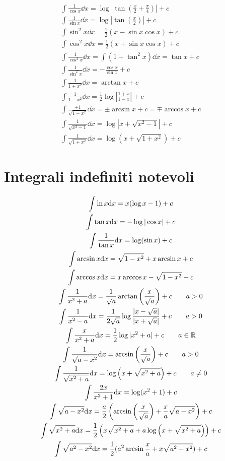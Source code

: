 \begin{gather}
\int\frac{1}{\cos x} \dd x = \log|\tan(\frac{x}{2}+\frac{\pi}{4})|+c \\
\int\frac{1}{\sin x} \dd x = \log|\tan(\frac{x}{2})|+c \\
\int\sin^2 x\dd x = \frac{1}{2}(x-\sin x\cos x)+c \\
\int\cos^2 x\dd x = \frac{1}{2}(x+\sin x\cos x)+c \\
\int\frac{1}{\cos^2x}\dd x = \int(1+\tan^2x)\dd x= \tan x+c \\
\int\frac{1}{\sin^2 x}\dd x = -\frac{\cos x}{\sin x}+c \\
\int\frac{1}{1+x^2}\dd x = \arctan x+c \\
\int\frac{1}{1-x^2}\dd x = \frac{1}{2}\log|\frac{1+x}{1-x}|+c \\
\int\frac{\pm1}{\sqrt{1-x^2}}\dd x = \pm\arcsin x+c = \mp\arccos x+c \\
\int\frac{1}{\sqrt{x^2-1}}\dd x = \log|x+\sqrt{x^2-1}|+c \\
\int\frac{1}{\sqrt{1+x^2}}\dd x = \log(x+\sqrt{1+x^2})+c
\end{gather}

\section{Integrali indefiniti notevoli}
\begin{gather}
\int\ln x\mathrm{d} x = x(\log x-1)+c\\
\int\tan x\mathrm{d} x = -\log|\cos x|+c \\
\int\frac{1}{\tan x}\mathrm{d} x = \log(\sin x)+c \\
\int\arcsin x\mathrm{d} x = \sqrt{1-x^2}+x\arcsin x+c \\
\int\arccos x\mathrm{d} x = x\arccos x-\sqrt{1-x^2}+c\\
\int\frac{1}{x^2+a}\mathrm{d} x = \frac{1}{\sqrt{a}}\arctan\left(\frac{x}{\sqrt{a}}\right)+c \qquad a>0\\
\int\frac{1}{x^2-a}\mathrm{d} x = \frac{1}{2\sqrt{a}}\log\frac{|x-\sqrt{a}|}{|x+\sqrt{a}|}+c \qquad a>0 \\
\int\frac{x}{x^2+a}\mathrm{d} x = \frac{1}{2}\log|x^2+a|+c \qquad a\in\mathbb{R}\\
\int\frac{1}{\sqrt{a-x^2}}\mathrm{d} x = \arcsin\left(\frac{x}{\sqrt{a}}\right)+c \qquad a>0\\
\int\frac{1}{\sqrt{x^2+a}}\mathrm{d} x = \log\left(x+\sqrt{x^2+a}\right)+c \qquad a\neq0 \\
\int\frac{2x}{x^2+1}\mathrm{d} x = \log(x^2+1)+c \\
\int\sqrt{a-x^2}\mathrm{d} x = \frac{a}{2}\left(\arcsin\left(\frac{x}{\sqrt{a}}\right)+\frac{x}{a}\sqrt{a-x^2}\right)+c \\
\int\sqrt{x^2+a}\mathrm{d} x = \frac{1}{2}\left(x\sqrt{x^2+a}+a\log\left(x+\sqrt{x^2+a}\right)\right)+c \\
\int\sqrt{a^2-x^2}\mathrm{d} x = \frac{1}{2}(a^2\arcsin\frac{x}{a}+x\sqrt{a^2-x^2})+c
\end{gather}

